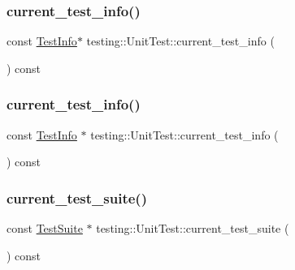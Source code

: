 \mbox{\label{classtesting_1_1_unit_test_a02b6ab72bb9d93805bd0efbb099b4ccc}} 
\subsubsection{\texorpdfstring{current\_test\_info()}{current\_test\_info()}\hspace{0.1cm}{\footnotesize\ttfamily [2/3]}}
{\footnotesize\ttfamily const \mbox{\hyperlink{classtesting_1_1_test_info}{Test\+Info}}$\ast$ testing\+::\+Unit\+Test\+::current\+\_\+test\+\_\+info (\begin{DoxyParamCaption}{ }\end{DoxyParamCaption}) const}

\mbox{\label{classtesting_1_1_unit_test_a088eaf814a33085ace3d881d22e6bdea}} 
\subsubsection{\texorpdfstring{current\_test\_info()}{current\_test\_info()}\hspace{0.1cm}{\footnotesize\ttfamily [3/3]}}
{\footnotesize\ttfamily const \mbox{\hyperlink{classtesting_1_1_test_info}{Test\+Info}} $\ast$ testing\+::\+Unit\+Test\+::current\+\_\+test\+\_\+info (\begin{DoxyParamCaption}{ }\end{DoxyParamCaption}) const}

\mbox{\label{classtesting_1_1_unit_test_aafbaafe78ecb5c3dd76849385b04d35e}} 
\subsubsection{\texorpdfstring{current\_test\_suite()}{current\_test\_suite()}\hspace{0.1cm}{\footnotesize\ttfamily [1/2]}}
{\footnotesize\ttfamily const \mbox{\hyperlink{classtesting_1_1_test_suite}{Test\+Suite}} $\ast$ testing\+::\+Unit\+Test\+::current\+\_\+test\+\_\+suite (\begin{DoxyParamCaption}{ }\end{DoxyParamCaption}) const}

